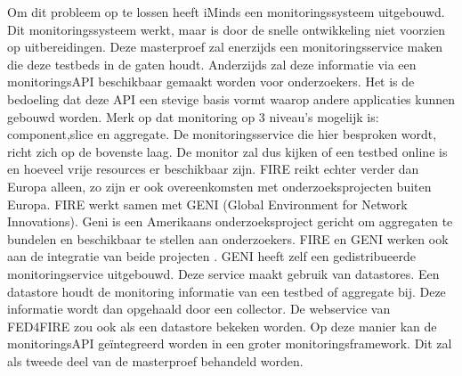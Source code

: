 \npar
Om dit probleem op te lossen heeft iMinds een monitoringssysteem uitgebouwd\citep{fed4fire-second-fed-arch}. Dit monitoringssysteem werkt, maar is door de snelle ontwikkeling niet voorzien op uitbereidingen. Deze masterproef zal enerzijds een monitoringsservice maken die deze testbeds in de gaten houdt. Anderzijds zal deze informatie via een monitoringsAPI beschikbaar gemaakt worden voor onderzoekers. Het is de bedoeling dat deze API een stevige basis vormt waarop andere applicaties kunnen gebouwd worden. Merk op dat monitoring op 3 niveau's mogelijk is: component,slice en aggregate. De monitoringsservice die hier besproken wordt, richt zich op de bovenste laag. De monitor zal dus kijken of een testbed online is en hoeveel vrije resources er beschikbaar zijn.
\npar
FIRE reikt echter verder dan Europa alleen, zo zijn er ook overeenkomsten met onderzoeksprojecten buiten Europa. 
FIRE werkt samen met GENI (Global Environment for Network Innovations). Geni is een Amerikaans onderzoeksproject gericht om aggregaten te bundelen en beschikbaar te stellen aan onderzoekers\citep{geni-what-is}.
FIRE en GENI werken ook aan de integratie van beide projecten\citep{fire-geni} \citep{geni-related}.
\npar
GENI heeft zelf een gedistribueerde monitoringservice uitgebouwd\citep{geni-monitor}. Deze service maakt gebruik van datastores\citep{geni-overview}. Een datastore houdt de monitoring informatie van een testbed of aggregate bij. Deze informatie wordt dan opgehaald door een collector. De webservice van FED4FIRE zou ook als een datastore bekeken worden. Op deze manier kan de monitoringsAPI geïntegreerd worden in een groter monitoringsframework. Dit zal als tweede deel van de masterproef behandeld worden.